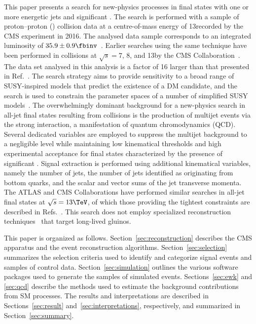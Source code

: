 This paper presents a search for new-physics processes in final states
with one or more energetic jets and significant \ptvecmiss. The search
is performed with a sample of proton--proton (\Pp\Pp) collision data
at a centre-of-mass energy of 13\TeV recorded by the CMS experiment in
2016.  The analysed data sample corresponds to an integrated
luminosity of $35.9 \pm 0.9\fbinv$~\cite{CMS:2017sdi}. Earlier
searches using the same technique have been performed in {\Pp\Pp}
collisions at $\sqrt{s} = 7$, 8, and 13\TeV by the CMS
Collaboration~\cite{Khachatryan:2011tk, Chatrchyan:2011zy,
  Chatrchyan:2012wa, Chatrchyan:2013mys, Khachatryan:2016pxa,
  Khachatryan:2016dvc}. The data set analysed in this analysis is a
factor of 16 larger than that presented in
Ref.~\cite{Khachatryan:2016dvc}. The search strategy aims to provide
sensitivity to a broad range of SUSY-inspired models that predict the
existence of a DM candidate, and the search is used to constrain the
parameter spaces of a number of simplified SUSY
models~\cite{Alwall:2008ag, Alwall:2008va, sms}. The overwhelmingly
dominant background for a new-physics search in all-jet final states
resulting from {\Pp\Pp} collisions is the production of multijet events
via the strong interaction, a manifestation of quantum chromodynamics
(QCD). Several dedicated variables are employed to suppress the
multijet background to a negligible level while maintaining low
kinematical thresholds and high experimental acceptance for final
states characterized by the presence of significant \ptvecmiss. Signal
extraction is performed using additional kinematical variables, namely
the number of jets, the number of jets identified as originating from
bottom quarks, and the scalar and vector sums of the jet transverse
momenta. The ATLAS and CMS Collaborations have performed similar
searches in all-jet final states at $\sqrt{s} = 13\TeV$, of which
those providing the tightest constraints are described in
Refs.~\cite{Aaboud:2016zdn, Sirunyan:2017cwe, Sirunyan:2017kqq}. This
search does not employ specialized reconstruction
techniques~\cite{Khachatryan:2010uf, Khachatryan:2011ts, Aad:2011yf,
  Aad:2012zn, Chatrchyan:2012sp, Aad:2013gva, Khachatryan:2015jha,
  Aad:2015rba, Aaboud:2016dgf, Khachatryan:2016sfv, Aaboud:2017iio}
that target long-lived gluinos.

This paper is organized as follows. Section~\ref{sec:reconstruction}
describes the CMS apparatus and the event reconstruction
algorithms. Section~\ref{sec:selection} summarizes the selection
criteria used to identify and categorize signal events and samples of
control data. Section~\ref{sec:simulation} outlines the various
software packages used to generate the samples of simulated
events. Sections~\ref{sec:ewk} and \ref{sec:qcd} describe the methods
used to estimate the background contributions from SM processes. The
results and interpretations are described in Sections~\ref{sec:result}
and~\ref{sec:interpretations}, respectively, and summarized in
Section~\ref{sec:summary}.

